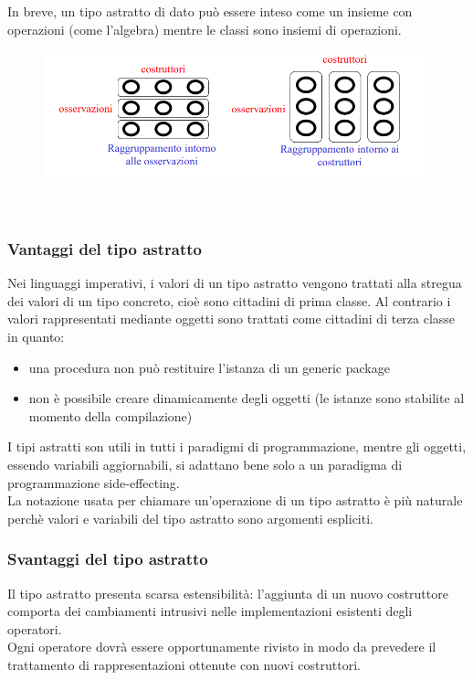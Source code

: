 \documentclass{article}
\begin{document}
	In breve, un tipo astratto di dato può essere inteso come un insieme con operazioni (come l'algebra) mentre le classi sono insiemi di operazioni.
	\begin{figure}[h]
		\centering
		\includegraphics[width=0.8\linewidth]{assets/tipiastratticlassi} 
		\label{fig:etichetta}
	\end{figure}
	\\
	\subsubsection*{Vantaggi del tipo astratto}
	Nei linguaggi imperativi, i valori di un tipo astratto vengono trattati alla stregua dei valori di un tipo concreto, cioè sono cittadini di prima classe. Al contrario i valori rappresentati mediante oggetti sono trattati come cittadini di terza classe in quanto:
	\begin{itemize}
		\item una procedura non può restituire l'istanza di un generic package
		\item non è possibile creare dinamicamente degli oggetti (le istanze sono stabilite al momento della compilazione)
	\end{itemize}
	I tipi astratti son utili in tutti i paradigmi di programmazione, mentre gli oggetti, essendo variabili aggiornabili, si adattano bene solo a un paradigma di programmazione side-effecting.\\
	La notazione usata per chiamare un'operazione di un tipo astratto è più naturale perchè valori e variabili del tipo astratto sono argomenti espliciti.

	\subsubsection*{Svantaggi del tipo astratto}
	Il tipo astratto presenta scarsa estensibilità: l'aggiunta di un nuovo costruttore comporta dei cambiamenti intrusivi nelle implementazioni esistenti degli operatori. \\
	Ogni operatore dovrà essere opportunamente rivisto in modo da prevedere il trattamento di rappresentazioni ottenute con nuovi costruttori.
\end{document}
